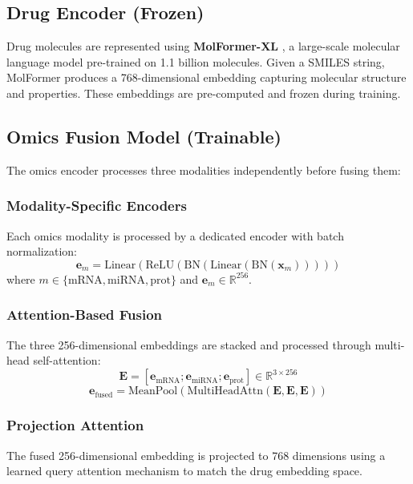 \documentclass[10pt,twocolumn]{article}
\begin{document}
\subsection{Drug Encoder (Frozen)}

Drug molecules are represented using \textbf{MolFormer-XL} \cite{molformer}, a large-scale molecular language model pre-trained on 1.1 billion molecules. Given a SMILES string, MolFormer produces a 768-dimensional embedding capturing molecular structure and properties. These embeddings are pre-computed and frozen during training.

\subsection{Omics Fusion Model (Trainable)}

The omics encoder processes three modalities independently before fusing them:

\subsubsection{Modality-Specific Encoders}
Each omics modality is processed by a dedicated encoder with batch normalization:
\begin{equation}
\mathbf{e}_m = \text{Linear}(\text{ReLU}(\text{BN}(\text{Linear}(\text{BN}(\mathbf{x}_m)))))
\end{equation}
where $m \in \{\text{mRNA}, \text{miRNA}, \text{prot}\}$ and $\mathbf{e}_m \in \mathbb{R}^{256}$.

\subsubsection{Attention-Based Fusion}
The three 256-dimensional embeddings are stacked and processed through multi-head self-attention:
\begin{equation}
\mathbf{E} = [\mathbf{e}_{\text{mRNA}}; \mathbf{e}_{\text{miRNA}}; \mathbf{e}_{\text{prot}}] \in \mathbb{R}^{3 \times 256}
\end{equation}
\begin{equation}
\mathbf{e}_{\text{fused}} = \text{MeanPool}(\text{MultiHeadAttn}(\mathbf{E}, \mathbf{E}, \mathbf{E}))
\end{equation}

\subsubsection{Projection Attention}
The fused 256-dimensional embedding is projected to 768 dimensions using a learned query attention mechanism to match the drug embedding space.
\end{document}
